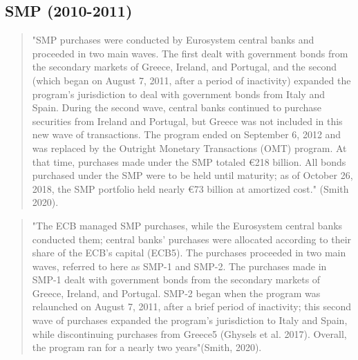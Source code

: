 \subsection{SMP (2010-2011)}
\begin{quote}
"SMP purchases were conducted by Eurosystem central banks and proceeded in two main waves. The first dealt with government bonds from the secondary markets of Greece, Ireland, and Portugal, and the second (which began on August 7, 2011, after a period of inactivity) expanded the program’s jurisdiction to deal with government bonds from Italy and Spain. During the second wave, central banks continued to purchase securities from Ireland and Portugal, but Greece was not included in this new wave of transactions. The program ended on September 6, 2012 and was replaced by the Outright Monetary Transactions (OMT) program. At that time, purchases made under the SMP totaled €218 billion. All bonds purchased under the SMP were to be held until maturity; as of October 26, 2018, the SMP portfolio held nearly €73 billion at amortized cost." (Smith 2020).
\end{quote}
\begin{quote}
"The ECB managed SMP purchases, while the Eurosystem central banks conducted them; central banks’ purchases were allocated according to their share of the ECB’s capital (ECB5). The purchases proceeded in two main waves, referred to here as SMP-1 and SMP-2. The purchases made in SMP-1 dealt with government bonds from the secondary markets of Greece, Ireland, and Portugal. SMP-2 began when the program was relaunched on August 7, 2011, after a brief period of inactivity; this second wave of purchases expanded the program’s jurisdiction to Italy and Spain, while discontinuing purchases from Greece5 (Ghysels et al. 2017). Overall, the program ran for a nearly two years"(Smith, 2020).
\end{quote}
